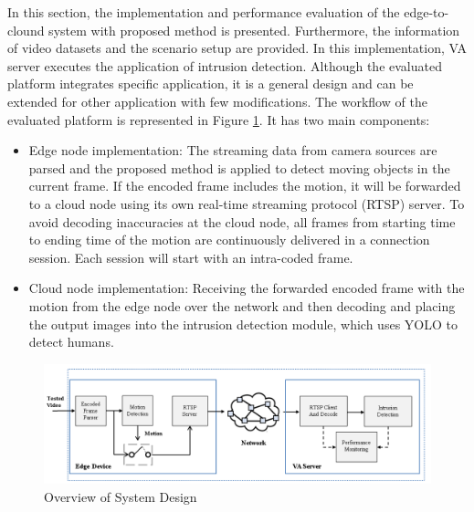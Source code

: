 In this section, the implementation and performance evaluation of the edge-to-clound system with proposed method is presented. Furthermore, the information of video datasets and the scenario setup are provided. In this implementation, VA server executes the application of intrusion detection. Although the evaluated platform integrates specific application, it is a general design and can be extended for other application with few modifications. The workflow of the evaluated platform is represented in Figure \ref{fig:sysdesign}. It has two main components:
\begin{itemize}
\item Edge node implementation: The streaming data from camera sources are parsed and the proposed method is applied to detect moving objects in the current frame. If the encoded frame includes the motion, it will be forwarded to a cloud node using its own real-time streaming protocol (RTSP) server. To avoid decoding inaccuracies at the cloud node, all frames from starting time to ending time of the motion are continuously delivered in a connection session. Each session will start with an intra-coded frame.
\item Cloud node implementation: Receiving the forwarded encoded frame with the motion from the edge node over the network and then decoding and placing the output images into the intrusion detection module, which uses YOLO to detect humans.
\end{itemize} 
\begin{figure}
\centering
 \includegraphics[width=1.1\linewidth]{Figures/SysDesign.png}
 \caption{Overview of System Design}
 \label{fig:sysdesign}
\end{figure}
